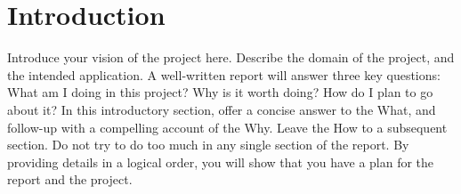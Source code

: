 \chapter{Introduction}

Introduce your vision of the project here. Describe the domain of the project, and the intended application. A well-written report will answer three key questions: What am I doing in this project? Why is it worth doing? How do I plan to go about it? In this introductory section, offer a concise answer to the What, and follow-up with a compelling account of the Why. Leave the How to a subsequent section. Do not try to do too much in any single section of the report. By providing details in a logical order, you will show that you have a plan for the report and the project.
